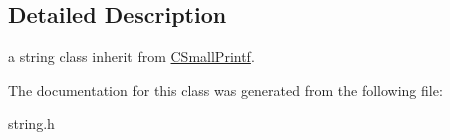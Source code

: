 \subsection{Detailed Description}
a string class inherit from \hyperlink{class_c_small_printf}{C\-Small\-Printf}. 

The documentation for this class was generated from the following file\-:\begin{DoxyCompactItemize}
\item 
string.\-h\end{DoxyCompactItemize}
